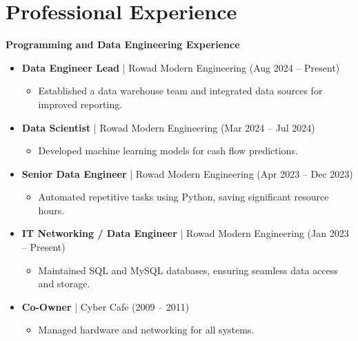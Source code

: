 \documentclass[10pt, letterpaper]{article}
\begin{document}
    \section{Professional Experience}
    \textbf{Programming and Data Engineering Experience}
    \begin{itemize}[leftmargin=*]
        \item \textbf{Data Engineer Lead} | Rowad Modern Engineering (Aug 2024 – Present)
        \begin{itemize}[leftmargin=1cm]
            \item Established a data warehouse team and integrated data sources for improved reporting.
        \end{itemize}
        \item \textbf{Data Scientist} | Rowad Modern Engineering (Mar 2024 – Jul 2024)
        \begin{itemize}[leftmargin=1cm]
            \item Developed machine learning models for cash flow predictions.
        \end{itemize}
        \item \textbf{Senior Data Engineer} | Rowad Modern Engineering (Apr 2023 – Dec 2023)
        \begin{itemize}[leftmargin=1cm]
            \item Automated repetitive tasks using Python, saving significant resource hours.
        \end{itemize}
        \item \textbf{IT Networking / Data Engineer} | Rowad Modern Engineering (Jan 2023 – Present)
        \begin{itemize}[leftmargin=1cm]
            \item Maintained SQL and MySQL databases, ensuring seamless data access and storage.
        \end{itemize}
        \item \textbf{Co-Owner} | Cyber Cafe (2009 – 2011)
        \begin{itemize}[leftmargin=1cm]
            \item Managed hardware and networking for all systems.
        \end{itemize}
    \end{itemize}
\end{document}
